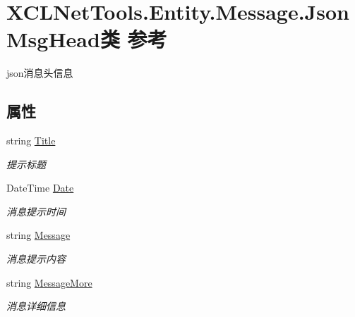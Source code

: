 \hypertarget{class_x_c_l_net_tools_1_1_entity_1_1_message_1_1_json_msg_head}{}\section{X\+C\+L\+Net\+Tools.\+Entity.\+Message.\+Json\+Msg\+Head类 参考}
\label{class_x_c_l_net_tools_1_1_entity_1_1_message_1_1_json_msg_head}


json消息头信息  


\subsection*{属性}
\begin{DoxyCompactItemize}
\item 
string \hyperlink{class_x_c_l_net_tools_1_1_entity_1_1_message_1_1_json_msg_head_adb0f08c4bef6b6cfe41e6c20eb1e7762}{Title}
\begin{DoxyCompactList}\small\item\em 提示标题 \end{DoxyCompactList}\item 
Date\+Time \hyperlink{class_x_c_l_net_tools_1_1_entity_1_1_message_1_1_json_msg_head_ae57b40b25eb4db28d428134d33358c90}{Date}
\begin{DoxyCompactList}\small\item\em 消息提示时间 \end{DoxyCompactList}\item 
string \hyperlink{class_x_c_l_net_tools_1_1_entity_1_1_message_1_1_json_msg_head_ab27af8e8d3ca0ab58610c3602d869b5b}{Message}
\begin{DoxyCompactList}\small\item\em 消息提示内容 \end{DoxyCompactList}\item 
string \hyperlink{class_x_c_l_net_tools_1_1_entity_1_1_message_1_1_json_msg_head_a5f65bd454c47d349a2a0fae291c73590}{Message\+More}
\begin{DoxyCompactList}\small\item\em 消息详细信息 \end{DoxyCompactList}\item 

\end{DoxyCompactItemize}
